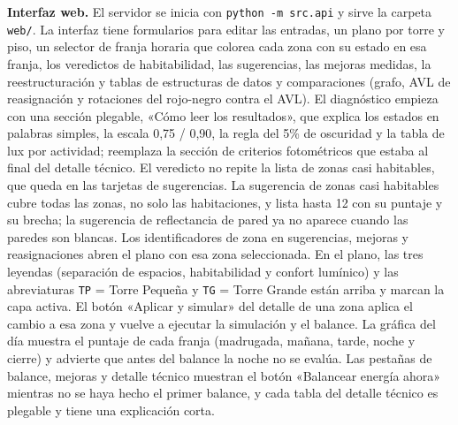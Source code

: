 \documentclass[12pt,a4paper]{article}
\newcommand{\codigo}[1]{\texttt{#1}}
\begin{document}
\textbf{Interfaz web.} El servidor se inicia con \codigo{python -m src.api} y sirve la carpeta \codigo{web/}. La interfaz tiene formularios para editar las entradas, un plano por torre y piso, un selector de franja horaria que colorea cada zona con su estado en esa franja, los veredictos de habitabilidad, las sugerencias, las mejoras medidas, la reestructuración y tablas de estructuras de datos y comparaciones (grafo, AVL de reasignación y rotaciones del rojo-negro contra el AVL). El diagnóstico empieza con una sección plegable, «Cómo leer los resultados», que explica los estados en palabras simples, la escala 0,75 / 0,90, la regla del 5\% de oscuridad y la tabla de lux por actividad; reemplaza la sección de criterios fotométricos que estaba al final del detalle técnico. El veredicto no repite la lista de zonas casi habitables, que queda en las tarjetas de sugerencias. La sugerencia de zonas casi habitables cubre todas las zonas, no solo las habitaciones, y lista hasta 12 con su puntaje y su brecha; la sugerencia de reflectancia de pared ya no aparece cuando las paredes son blancas. Los identificadores de zona en sugerencias, mejoras y reasignaciones abren el plano con esa zona seleccionada. En el plano, las tres leyendas (separación de espacios, habitabilidad y confort lumínico) y las abreviaturas \codigo{TP} = Torre Pequeña y \codigo{TG} = Torre Grande están arriba y marcan la capa activa. El botón «Aplicar y simular» del detalle de una zona aplica el cambio a esa zona y vuelve a ejecutar la simulación y el balance. La gráfica del día muestra el puntaje de cada franja (madrugada, mañana, tarde, noche y cierre) y advierte que antes del balance la noche no se evalúa. Las pestañas de balance, mejoras y detalle técnico muestran el botón «Balancear energía ahora» mientras no se haya hecho el primer balance, y cada tabla del detalle técnico es plegable y tiene una explicación corta.
\end{document}
